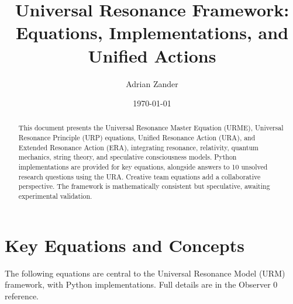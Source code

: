 \documentclass[12pt]{article}
\title{\textbf{\large Universal Resonance Framework: Equations, Implementations, and Unified Actions}}
\author{Adrian Zander}
\date{\today}
\begin{document}
\maketitle

\begin{abstract}
\begin{sloppypar}
This document presents the Universal Resonance Master Equation (URME), Universal Resonance Principle (URP) equations, Unified Resonance Action (URA), and Extended Resonance Action (ERA), integrating resonance, relativity, quantum mechanics, string theory, and speculative consciousness models. Python implementations are provided for key equations, alongside answers to 10 unsolved research questions using the URA. Creative team equations add a collaborative perspective. The framework is mathematically consistent but speculative, awaiting experimental validation.
\end{sloppypar}
\end{abstract}

\section*{Key Equations and Concepts}

The following equations are central to the Universal Resonance Model (URM) framework, with Python implementations. Full details are in the Observer 0 reference.
\end{document}
